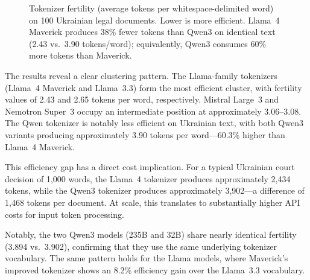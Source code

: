 \documentclass[11pt,a4paper]{article}
\begin{document}
\begin{figure}[t]
\centering
{}
\caption{Tokenizer fertility (average tokens per whitespace-delimited word) on 100 Ukrainian legal documents. Lower is more efficient. Llama~4 Maverick produces 38\% fewer tokens than Qwen3 on identical text (2.43 vs.\ 3.90 tokens/word); equivalently, Qwen3 consumes 60\% more tokens than Maverick.}
\label{fig:fertility}
\end{figure}

The results reveal a clear clustering pattern. The Llama-family tokenizers (Llama~4 Maverick and Llama~3.3) form the most efficient cluster, with fertility values of 2.43 and 2.65 tokens per word, respectively. Mistral Large~3 and Nemotron Super~3 occupy an intermediate position at approximately 3.06--3.08. The Qwen tokenizer is notably less efficient on Ukrainian text, with both Qwen3 variants producing approximately 3.90 tokens per word---60.3\% higher than Llama~4 Maverick.

This efficiency gap has a direct cost implication. For a typical Ukrainian court decision of 1,000 words, the Llama~4 tokenizer produces approximately 2,434 tokens, while the Qwen3 tokenizer produces approximately 3,902---a difference of 1,468 tokens per document. At scale, this translates to substantially higher API costs for input token processing.

Notably, the two Qwen3 models (235B and 32B) share nearly identical fertility (3.894 vs.\ 3.902), confirming that they use the same underlying tokenizer vocabulary. The same pattern holds for the Llama models, where Maverick's improved tokenizer shows an 8.2\% efficiency gain over the Llama~3.3 vocabulary.
\end{document}

